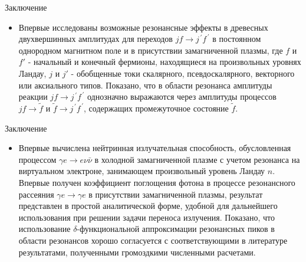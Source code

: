 \documentclass{beamer}
\begin{document}
\begin{frame}{Заключение}
\begin{itemize}

\item Впервые исследованы возможные резонансные эффекты в древесных двухвершинных 
амплитудах для переходов $jf\to j^{\,\prime} f^{\,\prime}$ в постоянном однородном 
магнитном поле и в присутствии замагниченной плазмы, где  $f$ и $f'$ - начальный и 
конечный фермионы, находящиеся на произвольных уровнях Ландау, $j$ и $j'$ - 
обобщенные токи скалярного, псевдоскалярного, векторного или  аксиального 
типов. Показано, что в области резонанса амплитуды реакции $jf\to j^{\,\prime} f^{\,\prime}$ 
однозначно выражаются через амплитуды процессов $jf\to \tilde f$ и  
$\tilde f\to j^{\,\prime} f^{\,\prime}$, содержащих промежуточное состояние $\tilde f$.


\end{itemize}
\end{frame}


\begin{frame}{Заключение}
\begin{itemize}
\item Впервые вычислена нейтринная 
излучательная способность, обусловленная процессом 
$\gamma e\to e\nu\bar\nu$ в холодной  замагниченной 
плазме с учетом резонанса на виртуальном электроне, 
занимающем произвольный уровень Ландау $n$. 
Впервые получен коэффициент поглощения фотона в процессе
резонансного рассеяния $\gamma e\to\gamma e$ 
в присутствии замагниченной плазмы, результат 
представлен в простой аналитической форме, 
удобной для дальнейшего использования при 
решении задачи переноса излучения. Показано, что использование  
$\delta$-функциональной аппроксимации резонансных пиков 
в области резонансов хорошо согласуется  с 
соответствующими в литературе результатами, 
полученными громоздкими численными расчетами.

\end{itemize}
\end{frame}
\end{document}
